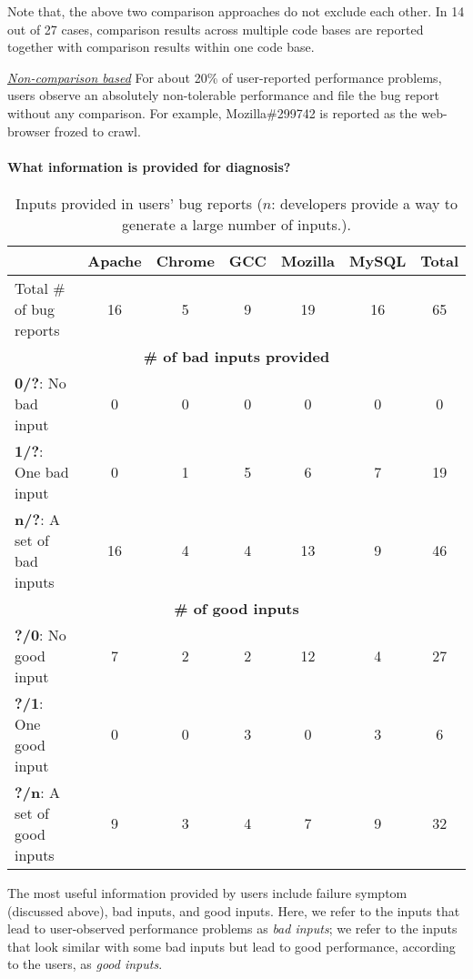 Note that, the above two comparison approaches do not exclude each other.
In 14 out of 27 cases, comparison results across multiple code bases are reported
together with comparison results within one code base.

\underline{\it Non-comparison based}
For about 20\% of user-reported performance problems, users observe an
absolutely non-tolerable performance and file the bug report without any comparison.
For example, Mozilla\#299742 is reported as the web-browser frozed to crawl.

\paragraph{What information is provided for diagnosis?}

\begin{table*}[tb!]
\begin{adjustwidth}{-.5in}{-.5in}
\scriptsize
\centering
{
\begin{tabular}{lcccccc}
\toprule
&Apache&Chrome&GCC&Mozilla&MySQL&Total\\
\midrule
Total \# of bug reports & 16 & 5 & 9 & 19 & 16 & 65 \\
\midrule
\multicolumn{7}{c}{\bf \# of bad inputs provided}\\
\multicolumn{1}{l}{{\bf 0/?}: No bad input }
&0&0&0&0&0&0\\
\multicolumn{1}{l}{{\bf 1/?}: One bad input}
&0&1&5&6&7&19\\
\multicolumn{1}{l}{{\bf n/?}: A set of bad inputs}
&16&4&4&13&9&46\\
\midrule
\multicolumn{7}{c}{\bf \# of good inputs}\\
\multicolumn{1}{l}{{\bf ?/0}: No good input}
&7&2&2&12&4&27\\
\multicolumn{1}{l}{{\bf ?/1}: One good input}
&0&0&3&0&3&6\\
\multicolumn{1}{l}{{\bf ?/n}: A set of good inputs}
&9&3&4&7&9&32\\
\bottomrule
\end{tabular}
}
\end{adjustwidth}
\caption{Inputs provided in users' bug reports ($n$: 
developers provide a way to generate a large number of inputs.).}
\label{tab:5_input}
\end{table*}

The most useful information provided by users include failure
symptom (discussed above), bad inputs, and good inputs. Here, we refer to the 
inputs that lead to user-observed performance problems
as \textit{bad inputs}; we refer to the
inputs that look similar with some bad inputs but lead to good performance,
according to the users,
as \textit{good inputs}.

